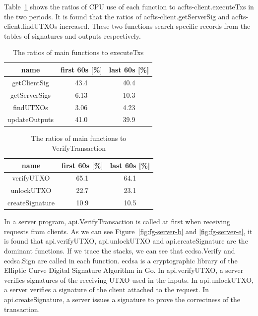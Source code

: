\documentclass[a4paper, oneside]{discothesis}
\begin{document}
Table~\ref{tbl:bn-client} shows the ratios of CPU use of each function
to acfts-client.executeTxs in the two periods.
It is found that the ratios of acfts-client.getServerSig and acfts-client.findUTXOs increased.
These two functions search specific records from the tables of signatures
and outputs respectively.
\begin{table}[t]
    \begin{center}
        \caption{The ratios of main functions to executeTxs}
        \label{tbl:bn-client}
        \begin{tabular}{|c|c|c|} \hline
            name & first 60s [\%] & last 60s [\%] \\ \hline \hline
            getClientSig & 43.4 & 40.4 \\
            getServerSigs & 6.13 & 10.3 \\
            findUTXOs & 3.06 & 4.23 \\ \hline
            updateOutputs & 41.0 & 39.9 \\ \hline
        \end{tabular}
    \end{center}
\end{table}
\begin{table}[t]
    \begin{center}
        \caption{The ratios of main functions to VerifyTransaction}
        \label{tbl:bn-server}
        \begin{tabular}{|c|c|c|} \hline
            name & first 60s [\%] & last 60s [\%] \\ \hline \hline
            verifyUTXO & 65.1 & 64.1 \\
            unlockUTXO & 22.7 & 23.1 \\
            createSignature & 10.9 & 10.5 \\ \hline
        \end{tabular}
    \end{center}
\end{table}

In a server program, api.VerifyTransaction is called at first
when receiving requests from clients.
As we can see Figure~\ref{fig:fg-server-b} and \ref{fig:fg-server-e}, it is found
that api.verifyUTXO, api.unlockUTXO and api.createSignature are the dominant functions.
If we trace the stacks, we can see that ecdsa.Verify and ecdsa.Sign are called in each function.
ecdsa is a cryptographic library of the Elliptic Curve Digital Signature Algorithm in Go.
In api.verifyUTXO, a server verifies signatures of the receiving UTXO used in the inputs.
In api.unlockUTXO, a server verifies a signature of the client attached to the request.
In api.createSignature, a server issues a signature to prove the correctness of the transaction.
\end{document}
